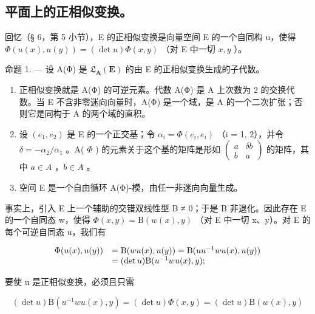 \subsection{平面上的正相似变换。}

回忆（§ 6，第 5 小节），E 的正相似变换是向量空间 E 的一个自同构 u，使得 \(\Phi(u(x), u(y)) = (\det u)\Phi(x, y)\) （对 E 中一切 \(x, y\) ）。

命题 1. --- 设 A(Φ) 是 \(\mathfrak{L}_{\mathbf{A}}(\mathbf{E})\) 的由 E 的正相似变换生成的子代数。

\begin{enumerate}
\def\labelenumi{\alph{enumi})}
\item
  正相似变换就是 A(Φ) 的可逆元素。代数 A(Φ) 是 A 上次数为 2 的交换代数。当 E 不含非零迷向向量时，A(Φ) 是一个域，是 A 的一个二次扩张；否则它是同构于 A 的两个域的直积。
\item
  设 \((e_{1}, e_{2})\) 是 E 的一个正交基；令 \(\alpha_{i} = \Phi(e_{i}, e_{i})\) （i = 1, 2），并令 \(\delta = -\alpha_{2}/\alpha_{1}\) 。A( \(\Phi\) ) 的元素关于这个基的矩阵是形如 \(\begin{pmatrix} a & \delta b \\ b & a \end{pmatrix}\) 的矩阵，其中 \(a \in A\) ，\(b \in A\) 。
\item
  空间 E 是一个自由循环 A(Φ)-模，由任一非迷向向量生成。
\end{enumerate}

事实上，引入 E 上一个辅助的交错双线性型 B ≠ 0；于是 B 非退化。因此存在 E 的一个自同态 w，使得 \(\Phi(x, y) = \mathrm{B}(w(x), y)\) （对 E 中一切 x、y）。对 E 的每个可逆自同态 u，我们有

\[
\begin{array}{r l} \Phi (u (x), u (y)) & = \mathrm{B} (w u (x), u (y)) = \mathrm{B} (u u ^ {- 1} w u (x), u (y)) \\ & = (\det u) \mathrm{B} (u ^ {- 1} w u (x), y); \end{array}
\]

要使 u 是正相似变换，必须且只需

\[
(\det u) \mathrm{B} (u ^ {- 1} w u (x), y) = (\det u) \Phi (x, y) = (\det u) \mathrm{B} (w (x), y)
\]

